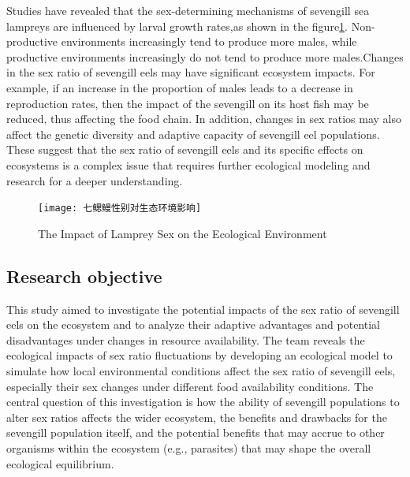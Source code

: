 \documentclass[CTeX = true]{mcmthesis}  %
\begin{document}
Studies\cite{sex determination of lamprey} have revealed that the sex-determining mechanisms of sevengill sea lampreys are influenced by larval growth rates,as shown in the figure\ref{fig:The Impact of Lamprey Sex on the Ecological Environment}. Non-productive environments increasingly tend to produce more males, while productive environments increasingly do not tend to produce more males.Changes in the sex ratio of sevengill eels may have significant ecosystem impacts. For example, if an increase in the proportion of males leads to a decrease in reproduction rates, then the impact of the sevengill on its host fish may be reduced, thus affecting the food chain. In addition, changes in sex ratios may also affect the genetic diversity and adaptive capacity of sevengill eel populations. These suggest that the sex ratio of sevengill eels and its specific effects on ecosystems is a complex issue that requires further ecological modeling and research for a deeper understanding.

\begin{figure}[htbp]
       \centering    
   \texttt{[image: 七鳃鳗性别对生态环境影响]}
     \caption{The Impact of Lamprey Sex on the Ecological Environment}
     \label{fig:The Impact of Lamprey Sex on the Ecological Environment}
\end{figure}

\subsection{Research objective}
This study aimed to investigate the potential impacts of the sex ratio of sevengill eels on the ecosystem and to analyze their adaptive advantages and potential disadvantages under changes in resource availability. The team reveals the ecological impacts of sex ratio fluctuations by developing an ecological model to simulate how local environmental conditions affect the sex ratio of sevengill eels, especially their sex changes under different food availability conditions. The central question of this investigation is how the ability of sevengill populations to alter sex ratios affects the wider ecosystem, the benefits and drawbacks for the sevengill population itself, and the potential benefits that may accrue to other organisms within the ecosystem (e.g., parasites) that may shape the overall ecological equilibrium.
\end{document}
